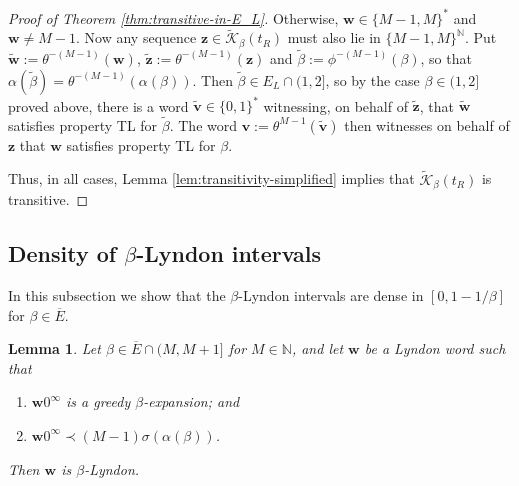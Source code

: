 \documentclass[11pt]{amsart}
\newtheorem{lemma}[theorem]{Lemma}
\theoremstyle{definition}
\theoremstyle{remark}
\numberwithin{equation}{section}
\newcommand{\N}{\ensuremath{\mathbb{N}}}
\newcommand{\Kt}{\widetilde{\mathcal{K}}}
\renewcommand{\v}{\mathbf{v}}
\newcommand{\w}{\mathbf{w}}
\newcommand{\z}{\mathbf{z}}
\newcommand{\f}{\infty}
\newcommand{\al}{\alpha}
\newcommand{\si}{\sigma}
\begin{document}
\begin{proof}[Proof of Theorem \ref{thm:transitive-in-E_L}]
{Otherwise, $\w\in\{M-1,M\}^*$ and $\w\neq M-1$. Now any sequence $\z\in\Kt_\beta(t_R)$ must also lie in $\{M-1,M\}^\N$. Put $\tilde{\w}:=\theta^{-(M-1)}(\w)$, $\tilde{\z}:=\theta^{-(M-1)}(\z)$ and $\tilde{\beta}:=\phi^{-(M-1)}(\beta)$, so that $\al(\tilde{\beta})=\theta^{-(M-1)}(\al(\beta))$. Then $\tilde{\beta}\in E_L\cap(1,2]$, so by the case $\beta\in(1,2]$ proved above, there is a word $\tilde{\v}\in\{0,1\}^*$ witnessing, on behalf of $\tilde{\z}$, that $\tilde{\w}$ satisfies property TL for $\tilde{\beta}$. The word $\v:=\theta^{M-1}(\tilde{\v})$ then witnesses on behalf of $\z$ that $\w$ satisfies property TL for $\beta$.

Thus, in all cases, Lemma \ref{lem:transitivity-simplified} implies that $\Kt_\beta(t_R)$ is transitive.
}
\end{proof}


\subsection{Density of $\beta$-Lyndon intervals} \label{subsec:dense-intervals}

In this subsection we show that the $\beta$-Lyndon intervals are dense in $[0,1-1/\beta]$ for $\beta\in\overline{E}$.

\begin{lemma} \label{lem:Lyndon-implies-beta-Lyndon}
Let {$\beta\in\overline{E}\cap(M,M+1]$ for $M\in\N$}, and let $\w$ be a Lyndon word such that
\begin{enumerate}[{\rm (i)}]
\item $\w0^\f$ is a greedy $\beta$-expansion; and
\item $\w0^\f\prec {(M-1)}\si(\al(\beta))$.
\end{enumerate}
Then $\w$ is $\beta$-Lyndon.
\end{lemma}
\end{document}
